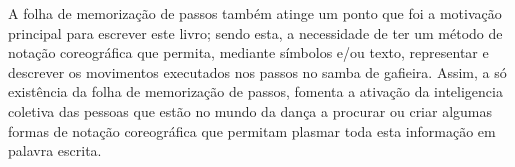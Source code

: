A folha de memorização de passos também atinge um ponto 
que foi a motivação principal para escrever este livro;
sendo esta, a necessidade de ter um método de notação coreográfica que permita, 
mediante símbolos e/ou texto, representar e descrever os movimentos executados
nos passos no samba de gafieira. Assim, 
a só existência da folha de memorização de passos, fomenta a ativação da 
inteligencia coletiva das pessoas que estão no mundo da dança 
a procurar ou criar algumas formas de notação coreográfica que permitam 
plasmar toda esta informação em palavra escrita.


 




